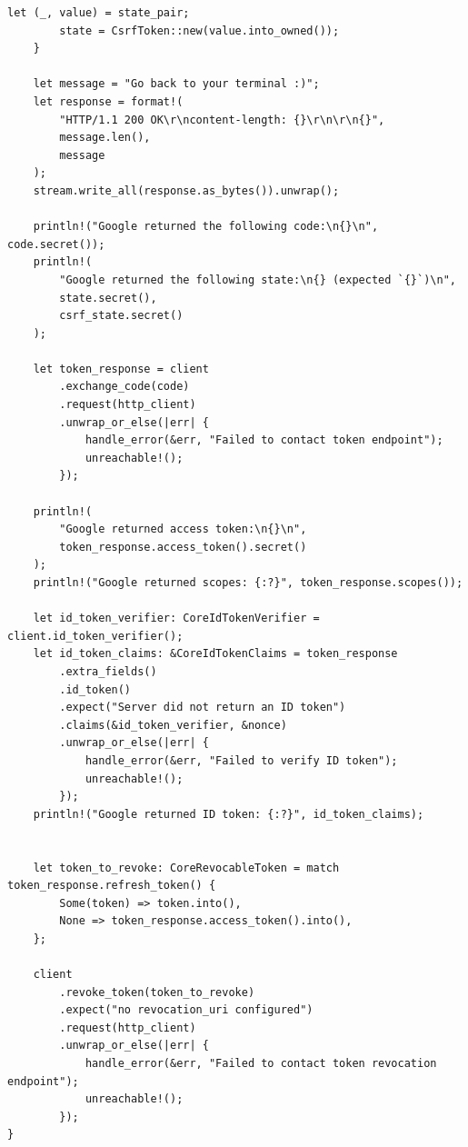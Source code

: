 \documentclass[notitlepage, hidelinks]{article}
\begin{document}
\begin{lstlisting}[language={[Sharp]C},frame=single,caption=OAuth2 und OICD in Rust,label=owaspfivegood]
        let (_, value) = state_pair;
        state = CsrfToken::new(value.into_owned());
    }

    let message = "Go back to your terminal :)";
    let response = format!(
        "HTTP/1.1 200 OK\r\ncontent-length: {}\r\n\r\n{}",
        message.len(),
        message
    );
    stream.write_all(response.as_bytes()).unwrap();

    println!("Google returned the following code:\n{}\n", code.secret());
    println!(
        "Google returned the following state:\n{} (expected `{}`)\n",
        state.secret(),
        csrf_state.secret()
    );

    let token_response = client
        .exchange_code(code)
        .request(http_client)
        .unwrap_or_else(|err| {
            handle_error(&err, "Failed to contact token endpoint");
            unreachable!();
        });

    println!(
        "Google returned access token:\n{}\n",
        token_response.access_token().secret()
    );
    println!("Google returned scopes: {:?}", token_response.scopes());

    let id_token_verifier: CoreIdTokenVerifier = client.id_token_verifier();
    let id_token_claims: &CoreIdTokenClaims = token_response
        .extra_fields()
        .id_token()
        .expect("Server did not return an ID token")
        .claims(&id_token_verifier, &nonce)
        .unwrap_or_else(|err| {
            handle_error(&err, "Failed to verify ID token");
            unreachable!();
        });
    println!("Google returned ID token: {:?}", id_token_claims);


    let token_to_revoke: CoreRevocableToken = match token_response.refresh_token() {
        Some(token) => token.into(),
        None => token_response.access_token().into(),
    };

    client
        .revoke_token(token_to_revoke)
        .expect("no revocation_uri configured")
        .request(http_client)
        .unwrap_or_else(|err| {
            handle_error(&err, "Failed to contact token revocation endpoint");
            unreachable!();
        });
}
\end{lstlisting}

\newpage




\end{document}
